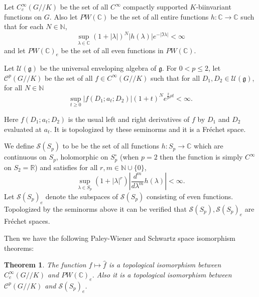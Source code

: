 \documentclass[11pt,reqno]{amsart}
\newcommand{\what}{\widehat}%
\newcommand{\R}{\mathbb R}%
\newcommand{\C}{\mathbb C}%
\newcommand{\N}{\mathbb N}%
\newtheorem{theorem}{Theorem}[section]
\theoremstyle{definition}
\theoremstyle{definition}
\numberwithin{equation}{section}
\begin{document}
Let $C_c^\infty(G//K)$ be the set of all $C^\infty$ compactly supported $K$-biinvariant functions on $G$.  Also let $PW(\C)$ be the set of all entire functions $h:\C\rightarrow \C$ such that for each $N\in \N$, $$\sup_{\lambda\in\C}(1 +|\lambda|)^N |h(\lambda)| e^{-|\Im\lambda|}<\infty$$ and let $PW(\C)_e$ be the set of all even functions in $PW(\C)$. 

Let $\mathcal U(\mathfrak g)$ be the universal
enveloping algebra of $\mathfrak{g}$. For $0<p\leq 2$, let $\mathcal C^p(G//K)$ be the set of all $f\in C^\infty(G//K)$ such that for all  $D_1,D_2\in \mathcal U(\mathfrak g)$, for all $N\in\mathbb N$
$$\sup_{t\geq 0}
|f(D_1;a_t;D_2)|(1+t)^N e^{\frac{2}{p}\rho t}<\infty.$$

Here $f(D_{1};a_{t};D_{2})$ is the usual left and right derivatives of $f$ by $D_1$ and $D_2$ evaluated at $a_t$.
It is topologized by these seminorms and it is a Fr\'{e}chet space.


We define
$\mathcal S(S_p)$ to be be the set of all functions
$h:S_p\rightarrow \mathbb C$ which are continuous on $S_p$,
holomorphic on $S_p^\circ$ (when $p=2$ then the function is simply
$C^\infty$ on $S_2=\R$) and satisfies for all $r,m\in \mathbb N\cup\{0\}$, $$\sup_{\lambda\in
S_p}(1+|\lambda|^{r})|\frac{d^{m}}{d\lambda^{m}}h(\lambda)|<
\infty.$$ Let $\mathcal
S(S_p)_e$  denote the subspaces of
$\mathcal S(S_p)$ consisting of even  functions. Topologized by the seminorms above it  can be
verified that $\mathcal S(S_p), \mathcal S(S_p)_e$  are Fr\'{e}chet spaces.

Then we have the following Paley-Wiener and Schwartz space isomorphism theorems:

\begin{theorem}\label{Paley-Wiener}
The function $f\mapsto \what{f}$ is a topological isomorphism between $C_c^\infty(G//K)$ and $PW(\C)_e$. Also it is a topological isomorphism between $\mathcal C^p(G//K)$ and $\mathcal S(S_p)_e$.
\end{theorem}
\end{document}
